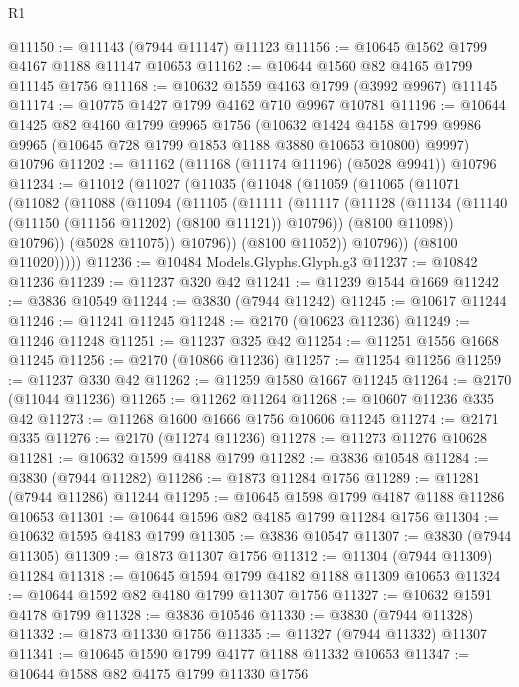 \begin{lexlean}{R1}
\begin{coremodule}
@11150 := @11143 (@7944 @11147) @11123
@11156 := @10645 @1562 @1799 @4167 @1188 @11147 @10653
@11162 := @10644 @1560 @82 @4165 @1799 @11145 @1756
@11168 := @10632 @1559 @4163 @1799 (@3992 @9967) @11145
@11174 := @10775 @1427 @1799 @4162 @710 @9967 @10781
@11196 := @10644
    @1425
    @82
    @4160
    @1799
    @9965
    @1756
    (@10632 @1424 @4158 @1799 @9986 @9965 (@10645 @728 @1799 @1853 @1188 @3880 @10653 @10800) @9997)
    @10796
@11202 := @11162 (@11168 (@11174 @11196) (@5028 @9941)) @10796
@11234 := @11012
    (@11027
      (@11035
        (@11048
          (@11059
            (@11065
              (@11071
                (@11082
                  (@11088
                    (@11094
                      (@11105
                        (@11111
                          (@11117
                            (@11128
                              (@11134 (@11140 (@11150 (@11156 @11202) (@8100 @11121)) @10796))
                              (@8100 @11098))
                            @10796))
                        (@5028 @11075))
                      @10796))
                  (@8100 @11052))
                @10796))
            (@8100 @11020)))))
@11236 := @10484 Models.Glyphs.Glyph.g3
@11237 := @10842 @11236
@11239 := @11237 @320 @42
@11241 := @11239 @1544 @1669
@11242 := @3836 @10549
@11244 := @3830 (@7944 @11242)
@11245 := @10617 @11244
@11246 := @11241 @11245
@11248 := @2170 (@10623 @11236)
@11249 := @11246 @11248
@11251 := @11237 @325 @42
@11254 := @11251 @1556 @1668 @11245
@11256 := @2170 (@10866 @11236)
@11257 := @11254 @11256
@11259 := @11237 @330 @42
@11262 := @11259 @1580 @1667 @11245
@11264 := @2170 (@11044 @11236)
@11265 := @11262 @11264
@11268 := @10607 @11236 @335 @42
@11273 := @11268 @1600 @1666 @1756 @10606 @11245
@11274 := @2171 @335
@11276 := @2170 (@11274 @11236)
@11278 := @11273 @11276 @10628
@11281 := @10632 @1599 @4188 @1799
@11282 := @3836 @10548
@11284 := @3830 (@7944 @11282)
@11286 := @1873 @11284 @1756
@11289 := @11281 (@7944 @11286) @11244
@11295 := @10645 @1598 @1799 @4187 @1188 @11286 @10653
@11301 := @10644 @1596 @82 @4185 @1799 @11284 @1756
@11304 := @10632 @1595 @4183 @1799
@11305 := @3836 @10547
@11307 := @3830 (@7944 @11305)
@11309 := @1873 @11307 @1756
@11312 := @11304 (@7944 @11309) @11284
@11318 := @10645 @1594 @1799 @4182 @1188 @11309 @10653
@11324 := @10644 @1592 @82 @4180 @1799 @11307 @1756
@11327 := @10632 @1591 @4178 @1799
@11328 := @3836 @10546
@11330 := @3830 (@7944 @11328)
@11332 := @1873 @11330 @1756
@11335 := @11327 (@7944 @11332) @11307
@11341 := @10645 @1590 @1799 @4177 @1188 @11332 @10653
@11347 := @10644 @1588 @82 @4175 @1799 @11330 @1756

\end{coremodule}
\end{lexlean}
